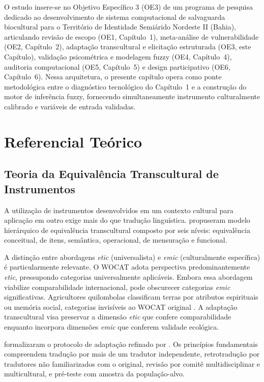 O estudo insere-se no Objetivo Específico 3 (OE3) de um programa de pesquisa dedicado ao desenvolvimento de sistema computacional de salvaguarda biocultural para o Território de Identidade Semiárido Nordeste II (Bahia), articulando revisão de escopo (OE1, Capítulo~1), meta-análise de vulnerabilidade (OE2, Capítulo~2), adaptação transcultural e elicitação estruturada (OE3, este Capítulo), validação psicométrica e modelagem fuzzy (OE4, Capítulo~4), auditoria computacional (OE5, Capítulo~5) e design participativo (OE6, Capítulo~6). Nessa arquitetura, o presente capítulo opera como ponte metodológica entre o diagnóstico tecnológico do Capítulo~1 e a construção do motor de inferência fuzzy, fornecendo simultaneamente instrumento culturalmente calibrado e variáveis de entrada validadas.


\section{Referencial Teórico}

\subsection{Teoria da Equivalência Transcultural de Instrumentos}

A utilização de instrumentos desenvolvidos em um contexto cultural para aplicação em outro exige mais do que tradução linguística.  propuseram modelo hierárquico de equivalência transcultural composto por seis níveis: equivalência conceitual, de itens, semântica, operacional, de mensuração e funcional.

A distinção entre abordagens \textit{etic} (universalista) e \textit{emic} (culturalmente específica) \cite{Pike1967} é particularmente relevante. O WOCAT adota perspectiva predominantemente \textit{etic}, pressupondo categorias universalmente aplicáveis. Embora essa abordagem viabilize comparabilidade internacional, pode obscurecer categorias \textit{emic} significativas. Agricultores quilombolas classificam terras por atributos espirituais ou memória social, categorias invisíveis ao WOCAT original \cite{Toledo2008}. A adaptação transcultural visa preservar a dimensão \textit{etic} que confere comparabilidade enquanto incorpora dimensões \textit{emic} que conferem validade ecológica.

 formalizaram o protocolo de adaptação refinado por . Os princípios fundamentais compreendem tradução por mais de um tradutor independente, retrotradução por tradutores não familiarizados com o original, revisão por comitê multidisciplinar e multicultural, e pré-teste com amostra da população-alvo.

